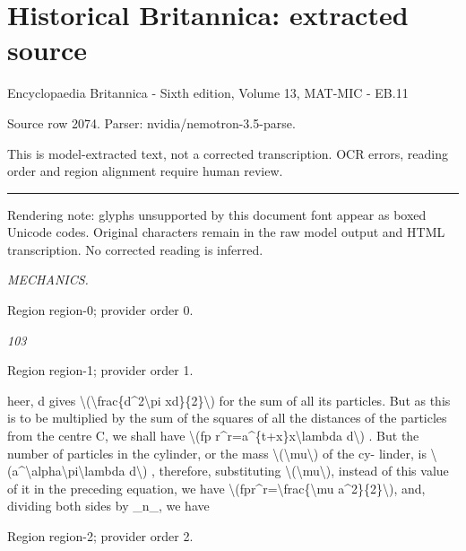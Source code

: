 \documentclass[11pt]{article}
\begin{document}
\section*{Historical Britannica: extracted source}
Encyclopaedia Britannica - Sixth edition, Volume 13, MAT-MIC - EB.11\par
{\small Source row 2074. Parser: nvidia/nemotron-3.5-parse.\par}
{\small This is model-extracted text, not a corrected transcription. OCR errors, reading order and region alignment require human review.\par}
\hrule\medskip
{\small\color{red} Rendering note: glyphs unsupported by this document font appear as boxed Unicode codes. Original characters remain in the raw model output and HTML transcription. No corrected reading is inferred.\par}

{\small\itshape MECHANICS.\par}

{\scriptsize\color{gray} Region region-0; provider order 0.\par}
\medskip

{\small\itshape 103\par}

{\scriptsize\color{gray} Region region-1; provider order 1.\par}
\medskip

heer, d gives \textbackslash{}(\textbackslash{}frac\{d\textasciicircum{}2\textbackslash{}pi xd\}\{2\}\textbackslash{}) for the sum of all its particles. But as this is to be multiplied by the sum of the squares of all the distances of the particles from the centre C, we shall have \textbackslash{}(fp r\textasciicircum{}r=a\textasciicircum{}\{t+x\}x\textbackslash{}lambda d\textbackslash{}) . But the number of particles in the cylinder, or the mass \textbackslash{}(\textbackslash{}mu\textbackslash{}) of the cy- linder, is \textbackslash{}(a\textasciicircum{}\textbackslash{}alpha\textbackslash{}pi\textbackslash{}lambda d\textbackslash{}) , therefore, substituting \textbackslash{}(\textbackslash{}mu\textbackslash{}), instead of this value of it in the preceding equation, we have \textbackslash{}(fpr\textasciicircum{}r=\textbackslash{}frac\{\textbackslash{}mu a\textasciicircum{}2\}\{2\}\textbackslash{}), and, dividing both sides by \_n\_, we have
\par

{\scriptsize\color{gray} Region region-2; provider order 2.\par}
\medskip
\end{document}
